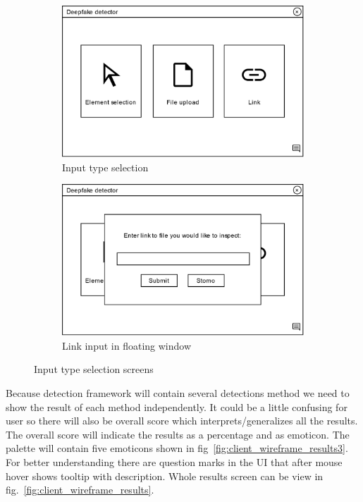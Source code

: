 \begin{figure}[H]
    \begin{subfigure}[h]{.498\linewidth}
        \centering
        \includegraphics[width=1\linewidth]{other-fig/client_wireframe_input_selection.png}
        \caption{Input type selection}
    \end{subfigure}
    \hfill
    \begin{subfigure}[h]{.498\linewidth}
        \centering
        \includegraphics[width=1\linewidth]{other-fig/client_wireframe_input_selection2.png}
        \caption{Link input in floating window}
    \end{subfigure}
    \caption{Input type selection screens}
    \label{fig:client_wireframe_input_selection}
\end{figure}

Because detection framework will contain several detections method we need to show the result of each method independently. It could be a little confusing for user so there will also be overall score which interprets/generalizes all the results. The overall score will indicate the results as a percentage and as emoticon. The palette will contain five emoticons shown in fig~\ref{fig:client_wireframe_results3}. For better understanding there are question marks in the UI that after mouse hover shows tooltip with description. Whole results screen can be view in fig.~\ref{fig:client_wireframe_results}.

